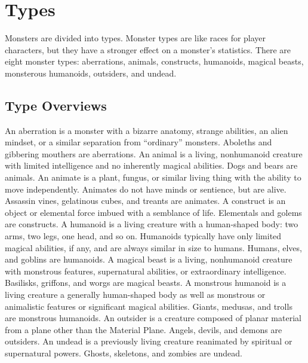 \chapter{Types}\label{Types}

Monsters are divided into types.
Monster types are like races for player characters, but they have a stronger effect on a monster's statistics.
There are eight monster types: aberrations, animals, constructs, humanoids, magical beasts, monsterous humanoids, outsiders, and undead.

\section{Type Overviews}

     An aberration is a monster with a bizarre anatomy, strange abilities, an alien mindset, or a similar separation from ``ordinary'' monsters.
    Aboleths and gibbering mouthers are aberrations.
     An animal is a living, nonhumanoid creature with limited intelligence and no inherently magical abilities.
    Dogs and bears are animals.
     An animate is a plant, fungus, or similar living thing with the ability to move independently.
    Animates do not have minds or sentience, but are alive.
    Assassin vines, gelatinous cubes, and treants are animates.
     A construct is an object or elemental force imbued with a semblance of life.
    Elementals and golems are constructs.
     A humanoid is a living creature with a human-shaped body: two arms, two legs, one head, and so on.
    Humanoids typically have only limited magical abilities, if any, and are always similar in size to humans.
    Humans, elves, and goblins are humanoids.
     A magical beast is a living, nonhumanoid creature with monstrous features, supernatural abilities, or extraordinary intelligence.
    Basilisks, griffons, and worgs are magical beasts.
     A monstrous humanoid is a living creature a generally human-shaped body as well as monstrous or animalistic features or significant magical abilities.
    Giants, medusas, and trolls are monstrous humanoids.
     An outsider is a creature composed of planar material from a plane other than the Material Plane.
    Angels, devils, and demons are outsiders.
     An undead is a previously living creature reanimated by spiritual or supernatural powers.
    Ghosts, skeletons, and zombies are undead.

